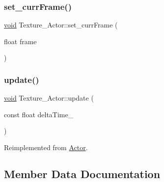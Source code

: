 \mbox{\label{classTexture__Actor_a1b5d946f426c7d724325021b6336cae7}} 
\subsubsection{\texorpdfstring{set\+\_\+curr\+Frame()}{set\_currFrame()}}
{\footnotesize\ttfamily \hyperlink{imgui__impl__opengl3__loader_8h_ac668e7cffd9e2e9cfee428b9b2f34fa7}{void} Texture\+\_\+\+Actor\+::set\+\_\+curr\+Frame (\begin{DoxyParamCaption}\item[{float}]{frame }\end{DoxyParamCaption})\hspace{0.3cm}{\ttfamily [inline]}}

\mbox{\label{classTexture__Actor_afe03163ea0bff0ea0fa3c3fb6c560c79}} 
\subsubsection{\texorpdfstring{update()}{update()}}
{\footnotesize\ttfamily \hyperlink{imgui__impl__opengl3__loader_8h_ac668e7cffd9e2e9cfee428b9b2f34fa7}{void} Texture\+\_\+\+Actor\+::update (\begin{DoxyParamCaption}\item[{const float}]{delta\+Time\+\_\+ }\end{DoxyParamCaption})\hspace{0.3cm}{\ttfamily [virtual]}}



Reimplemented from \hyperlink{classActor_a724ff8f2e9c34f15a6c443a3912504c4}{Actor}.



\subsection{Member Data Documentation}
\mbox{\label{classTexture__Actor_ade94d84772d24743144108f40746bf3d}} 
